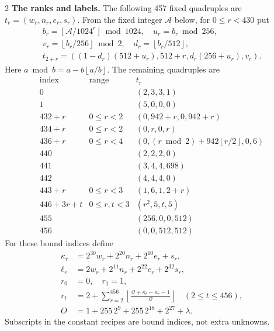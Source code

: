 \documentclass[10pt]{article}
\let\bigsum\sum
\renewcommand{\sum}{\bigsum\nolimits}
\newcommand{\fl}[1]{\left\lfloor #1\right\rfloor}
\begin{document}
\begin{multicols}{2}
\textbf{The ranks and labels.}
The following 457 fixed quadruples are $t_r=(w_r,n_r,e_r,s_r)$.
From the fixed integer $\mathcal A$ below, for $0\le r<430$ put
\[
\begin{gathered}
b_r=\fl{\mathcal A/1024^r}\bmod1024,\quad u_r=b_r\bmod256,\\
v_r=\fl{b_r/256}\bmod2,\quad d_r=\fl{b_r/512},\\
t_{2+r}=((1-d_r)(512+u_r),512+r,d_r(256+u_r),v_r).
\end{gathered}
\]
Here $a\bmod b=a-b\fl{a/b}$. The remaining quadruples are
\[
\begin{array}{c|c|l}
\text{index}&\text{range}&t_r\\\hline
0&& (2,3,3,1)\\
1&& (5,0,0,0)\\
432+r&0\le r<2&(0,942+r,0,942+r)\\
434+r&0\le r<2&(0,r,0,r)\\
436+r&0\le r<4&(0,(r\bmod2)+942\fl{r/2},0,6)\\
440&&(2,2,2,0)\\
441&&(3,4,4,698)\\
442&&(4,4,4,0)\\
443+r&0\le r<3&(1,6,1,2+r)\\
446+3r+t&0\le r,t<3&(r^2,5,t,5)\\
455&&(256,0,0,512)\\
456&&(0,0,512,512)
\end{array}
\]
For these bound indices define
\[
\begin{aligned}
\kappa_r&=2^{30}w_r+2^{20}n_r+2^{10}e_r+s_r,\\
\ell_r&=2w_r+2^{11}n_r+2^{22}e_r+2^{32}s_r,\\
r_0&=0,\quad r_1=1,\\
r_t&=2+\sum_{r=2}^{456}\fl{\frac{\mathcal Q+\kappa_t-\kappa_r-1}{\mathcal Q}}
 \quad(2\le t\le456),\\
O&=1+255\,2^9+255\,2^{18}+2^{27}+\lambda.
\end{aligned}
\]
Subscripts in the constant recipes are bound indices, not extra unknowns.


\end{multicols}
\end{document}
